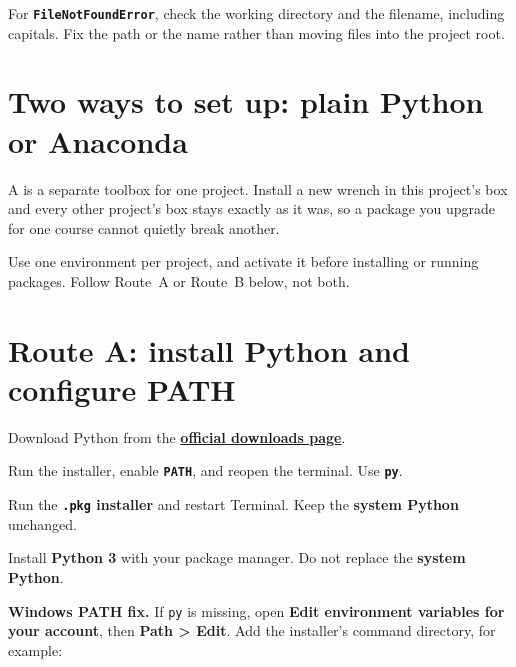 \begin{pitfall}
For \textbf{\texttt{FileNotFoundError}}, check the working directory and the filename, including capitals. Fix the path or the name rather than moving files into the project root.
\end{pitfall}

\section{Two ways to set up: plain Python or Anaconda}

\begin{analogy}
A  is a separate toolbox for one project. Install a new wrench in this project's box and every other project's box stays exactly as it was, so a package you upgrade for one course cannot quietly break another.
\end{analogy}

\begin{keyidea}
Use one environment per project, and activate it before installing or running packages. Follow Route~A or Route~B below, not both.
\end{keyidea}

\section{Route A: install Python and configure PATH}

Download Python from the \href{https://www.python.org/downloads/}{\textbf{official downloads page}}.

\begin{description}[leftmargin=1.15in,style=nextline]
  \item[Windows] Run the installer, enable \textbf{\texttt{PATH}}, and reopen the terminal. Use \textbf{\texttt{py}}.
  \item[macOS] Run the \textbf{\texttt{.pkg} installer} and restart Terminal. Keep the \textbf{system Python} unchanged.
  \item[Linux] Install \textbf{Python 3} with your package manager. Do not replace the \textbf{system Python}.
\end{description}

\textbf{Windows PATH fix.} If \texttt{py} is missing, open \textbf{Edit environment variables for your account}, then \textbf{Path > Edit}. Add the installer's command directory, for example:

\begin{lstlisting}[style=utpterminal]
%LocalAppData%\Python\bin
\end{lstlisting}

